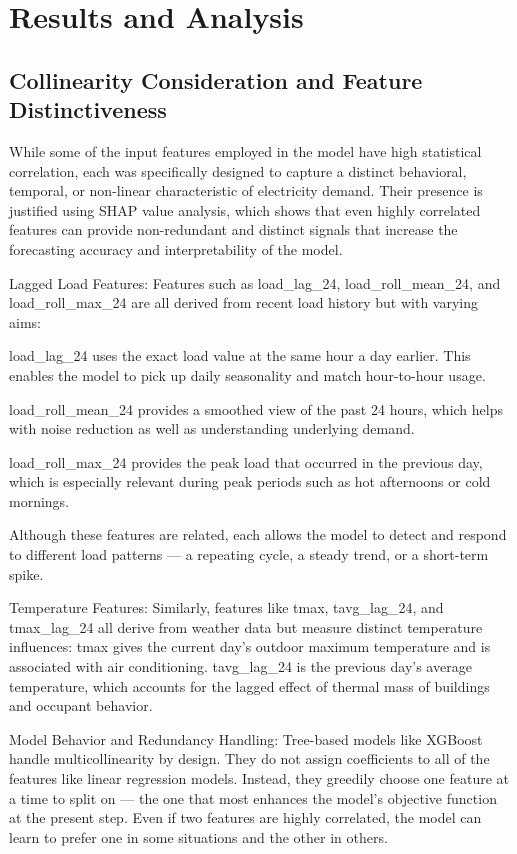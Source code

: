 \documentclass[final,numbered]{ifacconf}
\begin{document}
\section{Results and Analysis}
\subsection*{Collinearity Consideration and Feature Distinctiveness}

While some of the input features employed in the model have high statistical correlation, each was specifically designed to capture a distinct behavioral, temporal, or non-linear characteristic of electricity demand. Their presence is justified using SHAP value analysis, which shows that even highly correlated features can provide non-redundant and distinct signals that increase the forecasting accuracy and interpretability of the model.

Lagged Load Features:
Features such as load_lag_24, load_roll_mean_24, and load_roll_max_24 are all derived from recent load history but with varying aims:

load_lag_24 uses the exact load value at the same hour a day earlier. This enables the model to pick up daily seasonality and match hour-to-hour usage.

load_roll_mean_24 provides a smoothed view of the past 24 hours, which helps with noise reduction as well as understanding underlying demand.

load_roll_max_24 provides the peak load that occurred in the previous day, which is especially relevant during peak periods such as hot afternoons or cold mornings.

Although these features are related, each allows the model to detect and respond to different load patterns — a repeating cycle, a steady trend, or a short-term spike.

Temperature Features:
Similarly, features like tmax, tavg_lag_24, and tmax_lag_24 all derive from weather data but measure distinct temperature influences:
tmax gives the current day's outdoor maximum temperature and is  associated with air conditioning. tavg_lag_24 is the previous day's average temperature, which accounts for the lagged effect of thermal mass of buildings and occupant behavior.

Model Behavior and Redundancy Handling:
Tree-based models like XGBoost handle multicollinearity by design. They do not assign coefficients to all of the features like linear regression models. Instead, they greedily choose one feature at a time to split on — the one that most enhances the model's objective function at the present step. Even if two features are highly correlated, the model can learn to prefer one in some situations and the other in others. 
\end{document}
